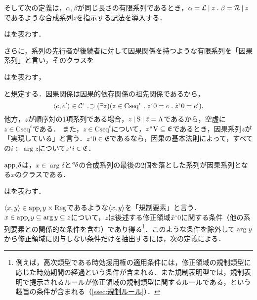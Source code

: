 \noindent そして次の定義は，$\alpha,\beta$が同じ長さの有限系列であるとき，$ \alpha = \mathcal{L}\resl z\con{1}\beta = \mathcal{R}\resl z $であるような合成系列$ z $を指示する記法を導入する．
\begin{df}
\label{df:合成系列}
    \kagi{$
        \alpha\diamond\beta
    $}はを表わす．
\end{df}

\noindent さらに，系列の先行者が後続者に対して因果関係を持つような有限系列を「因果系列」と言い，そのクラスを
\begin{df}
\label{df:因果系列}
はを表わす，
\end{df}
\noindent と規定する．因果関係は因果的依存関係の祖先関係であるから，
\[
    \orp{e,e'}\in\mathcal{C}^\epsilon\case{1}{1}{0}
    (\exists z)(
        z\in \mathrm{Cseq}^\epsilon\con{1}z\fap 0 = e\con{1}\tilde{z}\fap 0 = e'
    ).
\]
他方，$z$が順序対の1項系列である場合，$ z\mathbin{\mid}\mathrm{S}\mathbin{\mid}\breve{z}=\Lambda $であるから，空虚に$ z\in\mathrm{Cseq}^\epsilon $である．
また，$z\in\mathrm{Cseq}^\epsilon$について，$z{\mspace{1mu}{``}\mspace{1mu}}\mathrm{V}\subseteq\mathfrak{E}$であるとき，因果系列$z$が「実現している」と言う．$z{\mspace{1mu}{`}\mspace{1mu}} 0\in\mathfrak{E}$であるなら，因果の基本法則によって，すべての$i\in\arg z$について$z{\mspace{1mu}{`}\mspace{1mu}} i\in\mathfrak{E}$．

$\app{\epsilon}\delta$は，$x\in \arg\delta$と$ {^\triangleleft}\delta $の合成系列の最後の2個を落とした系列が因果系列となる$ x $のクラスである．
\begin{df}
\label{df:適用条件}
\kagi{$
    \app{\epsilon} \delta
$}はを表わす．
\end{df}
\noindent $ \langle x,y \rangle\in\mathrm{app}_{\epsilon} y\times\mathrm{Reg} $であるような$ \langle x,y \rangle $を「規制要素」と言う．
$ x\in\mathrm{app}_{\epsilon}y\subseteq\arg y\subseteq z $について，$z$は後述する修正領域$\tilde{x}{\mspace{1mu}{`}\mspace{1mu}} 0$に関する条件（他の系列要素との関係的な条件を含む）であり得る\footnote{
    例えば，高次類型である時効援用権の適用条件には，修正領域の規制類型に応じた時効期間の経過という条件が含まれる．また規制表明型では，規制表明で提示されるルールが修正領域の規制類型に関するルールである，という趣旨の条件が含まれる（\ref{ssec:規制ルール}）．
}．このような条件を除外して$ \arg y $から修正領域に関与しない条件だけを抽出するには，次の定義による．

